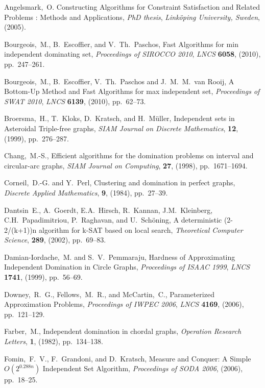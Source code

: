 \documentclass[a4paper,10pt]{article}
\theoremstyle{plain}
\theoremstyle{definition}
\theoremstyle{remark}
\begin{document}
\begin{thebibliography}{99}





Angelsmark,~O.
Constructing Algorithms for Constraint Satisfaction and Related Problems : Methods and Applications,
{\em PhD thesis\/}, {\em Link\"oping University, Sweden}, (2005).

Bourgeois,~M., B.~Escoffier, and V.~Th.~Paschos,
Fast Algorithms for min independent dominating set,
{\em Proceedings of SIROCCO 2010\/}, {\em LNCS}
{\bf 6058}, (2010), pp.~247--261.

Bourgeois,~M., B.~Escoffier, V.~Th.~Paschos and J.~M.~M.~van Rooij,
A Bottom-Up Method and Fast Algorithms for max independent set,
{\em Proceedings of SWAT 2010\/}, {\em LNCS}
{\bf 6139}, (2010), pp.~62--73.

Broersma,~H., T.~Kloks, D.~Kratsch, and H.~M\"uller,
Independent sets in Asteroidal Triple-free graphs,
{\em SIAM Journal on Discrete Mathematics\/},
{\bf 12}, (1999), pp.~276--287.

Chang,~M.-S.,
Efficient algorithms for the domination problems on interval and circular-arc graphs,
{\em SIAM Journal on Computing\/},
{\bf 27}, (1998), pp.~1671--1694.

Corneil,~D.-G. and Y.~Perl,
Clustering and domination in perfect graphs,
{\em Discrete Applied Mathematics\/},
{\bf 9}, (1984), pp.~27--39.


Dantsin~E., A.~Goerdt, E.A.~Hirsch, R.~Kannan, J.M.~Kleinberg, C.H.~Papadimitriou,
P.~Raghavan, and U.~Schöning,
A deterministic (2-2/(k+1))n algorithm for k-SAT based on local search,
{\em Theoretical Computer Science\/},
{\bf 289}, (2002), pp.~69--83.

Damian-Iordache,~M. and S.~V.~Pemmaraju,
Hardness of Approximating Independent Domination in Circle Graphs,
{\em Proceedings of ISAAC 1999\/}, {\em LNCS}
{\bf 1741}, (1999), pp.~56--69.

Downey,~R.~G., Fellows,~M.~R., and McCartin,~C.,
Parameterized Approximation Problems,
{\em Proceedings of IWPEC 2006\/}, {\em LNCS\/}
{\bf 4169}, (2006), pp.~121--129.

Farber,~M.,
Independent domination in chordal graphs,
{\em Operation Research Letters\/},
{\bf 1}, (1982), pp.~134--138.

Fomin,~F.~V., F.~Grandoni, and D.~Kratsch,
Measure and Conquer: A Simple $O(2^{0.288n})$ Independent Set Algorithm,
{\em Proceedings of SODA 2006\/}, (2006), pp.~18--25.


\end{thebibliography}
\end{document}
